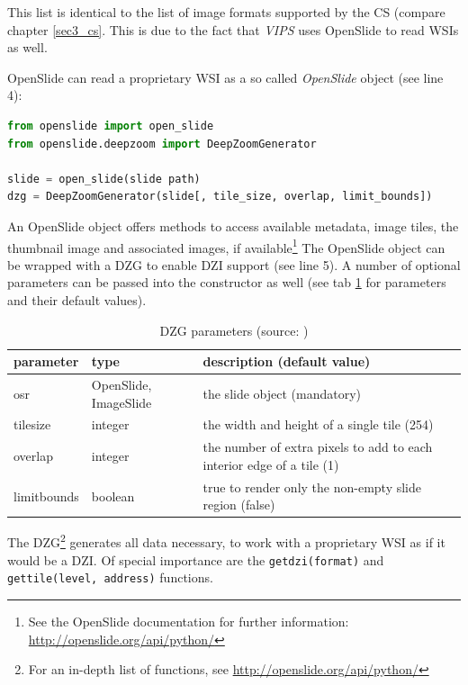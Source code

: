 This list is identical to the list of image formats supported by the CS (compare chapter \ref{sec3_cs}. This is due to the fact that \emph{VIPS} uses OpenSlide to read WSIs as well\cite{web:vips}.

OpenSlide can read a proprietary WSI as a so called \emph{OpenSlide} object (see line 4):

\begin{lstlisting}[language=python, frame=single]
from openslide import open_slide
from openslide.deepzoom import DeepZoomGenerator

slide = open_slide(slide path)
dzg = DeepZoomGenerator(slide[, tile_size, overlap, limit_bounds])
\end{lstlisting}

An OpenSlide object offers methods to access available metadata, image tiles, the thumbnail image and associated images, if available\footnote{
	See the OpenSlide documentation for further information: \url{http://openslide.org/api/python/}
} The OpenSlide object can be wrapped with a DZG to enable DZI support (see line 5)\cite{web:openslide}. A number of optional parameters can be passed into the constructor as well (see tab \ref{tab4_DZGparam} for parameters and their default values).

\begin{table}[H]
	\begin{center}
		\begin{tabular}{| p{2.5cm} | p{2cm} | p{5.5cm} |}
			\hline
			\textbf{parameter} & \textbf{type} & \textbf{description (default value)}\\ \hline
			osr & OpenSlide, ImageSlide & the slide object (mandatory)
			\\ \hline
			tile{\textunderscore}size & integer & the width and height of a single tile (254)\\ \hline
			overlap & integer & the number of extra pixels to add to each interior edge of a tile (1)\\ \hline
			limit{\textunderscore}bounds & boolean & true to render only the non-empty slide region (false)\\ \hline
		\end{tabular}
		\caption{DZG parameters (source: \cite{web:openslide})}
		\label{tab4_DZGparam}
	\end{center}
\end{table}

The DZG\footnote{
	For an in-depth list of functions, see \url{http://openslide.org/api/python/}
} generates all data necessary, to work with a proprietary WSI as if it would be a DZI\cite{web:openslide}. Of special importance are the \texttt{get{\textunderscore}dzi(format)} and \texttt{get{\textunderscore}tile(level, address)} functions.

